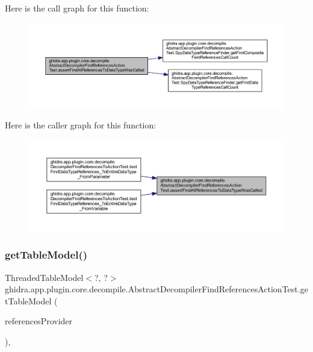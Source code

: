Here is the call graph for this function\+:
\nopagebreak
\begin{figure}[H]
\begin{center}
\leavevmode
\includegraphics[width=350pt]{classghidra_1_1app_1_1plugin_1_1core_1_1decompile_1_1_abstract_decompiler_find_references_action_test_aedb707fa1d0bc095ddb1545409c14e1c_cgraph}
\end{center}
\end{figure}
Here is the caller graph for this function\+:
\nopagebreak
\begin{figure}[H]
\begin{center}
\leavevmode
\includegraphics[width=350pt]{classghidra_1_1app_1_1plugin_1_1core_1_1decompile_1_1_abstract_decompiler_find_references_action_test_aedb707fa1d0bc095ddb1545409c14e1c_icgraph}
\end{center}
\end{figure}
\mbox{\label{classghidra_1_1app_1_1plugin_1_1core_1_1decompile_1_1_abstract_decompiler_find_references_action_test_ab222409e434c109cfeb9d28de92365b9}} 
\subsubsection{\texorpdfstring{getTableModel()}{getTableModel()}}
{\footnotesize\ttfamily Threaded\+Table\+Model$<$?, ?$>$ ghidra.\+app.\+plugin.\+core.\+decompile.\+Abstract\+Decompiler\+Find\+References\+Action\+Test.\+get\+Table\+Model (\begin{DoxyParamCaption}\item[{Location\+References\+Provider}]{references\+Provider }\end{DoxyParamCaption})\hspace{0.3cm}{\ttfamily [inline]}, {\ttfamily [protected]}}



